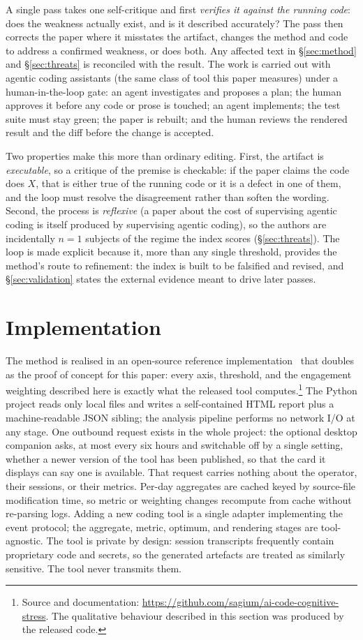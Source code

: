 \documentclass[10pt,twocolumn]{article}
\begin{document}
A single pass takes one self-critique and first \emph{verifies it against the
running code}: does the weakness actually exist, and is it described accurately?
The pass then corrects the paper where it misstates the artifact, changes the
method and code to address a confirmed weakness, or does both. Any affected text
in \S\ref{sec:method} and \S\ref{sec:threats} is reconciled with the result. The work is
carried out with agentic coding assistants (the same class of tool this paper
measures) under a human-in-the-loop gate: an agent investigates and proposes a
plan; the human approves it before any code or prose is touched; an agent
implements; the test suite must stay green; the paper is rebuilt; and the human
reviews the rendered result and the diff before the change is accepted.

Two properties make this more than ordinary editing. First, the artifact is
\emph{executable}, so a critique of the premise is checkable: if the paper claims
the code does $X$, that is either true of the running code or it is a defect in one
of them, and the loop must resolve the disagreement rather than soften the wording.
Second, the process is \emph{reflexive} (a paper about the cost of supervising
agentic coding is itself produced by supervising agentic coding), so the authors
are incidentally $n{=}1$ subjects of the regime the index scores
(\S\ref{sec:threats}). The loop is made explicit because it, more than any single
threshold, provides the method's route to refinement: the index is built to be
falsified and revised, and \S\ref{sec:validation} states the external evidence
meant to drive later passes.

\section{Implementation}\label{sec:impl}
The method is realised in an open-source reference
implementation~\cite{acsrepo} that doubles as the proof of concept for this
paper: every axis, threshold, and the engagement weighting described here is
exactly what the released tool computes.\footnote{Source and documentation:
\url{https://github.com/sagium/ai-code-cognitive-stress}. The qualitative
behaviour described in this section was produced by the released code.} The Python
project reads only local files and writes a self-contained HTML report plus a
machine-readable JSON sibling; the analysis pipeline performs no network I/O at
any stage. One outbound request exists in the whole project: the optional
desktop companion asks, at most every six hours and switchable off by a single
setting, whether a newer version of the tool has been published, so that the
card it displays can say one is available. That request carries nothing about
the operator, their sessions, or their metrics.
Per-day aggregates are cached keyed by source-file modification time, so metric
or weighting changes recompute from cache without re-parsing logs. Adding a new
coding tool is a single adapter implementing the event protocol; the aggregate,
metric, optimum, and rendering stages are tool-agnostic. The tool is private
by design: session transcripts frequently contain proprietary code and
secrets, so the generated artefacts are treated as similarly sensitive. The tool
never transmits them.
\end{document}
